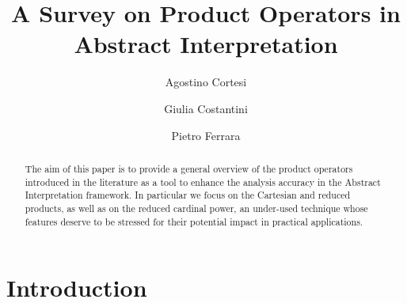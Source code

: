 \documentclass[submission,copyright,creativecommons]{eptcs}
\title{A Survey on Product Operators in Abstract Interpretation}
\author{Agostino Cortesi
\institute{Ca' Foscari University\\ Venice, Italy}
\email{cortesi@dsi.unive.it}
\and
Giulia Costantini
\institute{Ca' Foscari University\\ Venice, Italy}
\email{costantini@dsi.unive.it}
\and
Pietro Ferrara
\institute{ETH \\Zurich, Switzerland}
\email{pietro.ferrara@inf.ethz.ch}
}
\begin{document}
\maketitle

\begin{abstract}
The aim of this paper is to provide a general overview of the product operators introduced in the literature as a tool to enhance the analysis accuracy in the Abstract Interpretation framework.  In particular we focus on the Cartesian and reduced products, as well as on the reduced cardinal power, an under-used technique whose features deserve to be stressed for their potential impact in practical applications. 
\end{abstract}

\section{Introduction}
\end{document}
